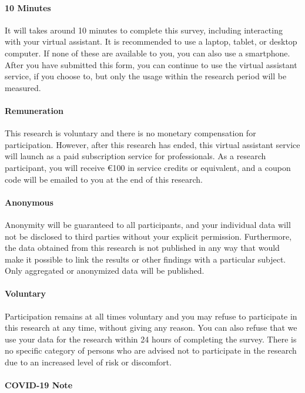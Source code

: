 \documentclass{article}
\begin{document}
\paragraph{10 Minutes}

It will takes around 10 minutes to complete this survey, including interacting with your virtual assistant. It is recommended to use a laptop, tablet, or desktop computer. If none of these are available to you, you can also use a smartphone. After you have submitted this form, you can continue to use the virtual assistant service, if you choose to, but only the usage within the research period will be measured.

\paragraph{Remuneration}

This research is voluntary and there is no monetary compensation for participation. However, after this research has ended, this virtual assistant service will launch as a paid subscription service for professionals. As a research participant, you will receive €100 in service credits or equivalent, and a coupon code will be emailed to you at the end of this research.

\paragraph{Anonymous}

Anonymity will be guaranteed to all participants, and your individual data will not be disclosed to third parties without your explicit permission. Furthermore, the data obtained from this research is not published in any way that would make it possible to link the results or other findings with a particular subject. Only aggregated or anonymized data will be published.

\paragraph{Voluntary}

Participation remains at all times voluntary and you may refuse to participate in this research at any time, without giving any reason. You can also refuse that we use your data for the research within 24 hours of completing the survey. There is no specific category of persons who are advised not to participate in the research due to an increased level of risk or discomfort.

\paragraph{COVID-19 Note}
\end{document}
